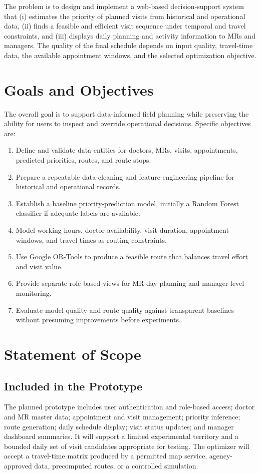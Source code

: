 \documentclass[12pt,a4paper,oneside]{report}
\begin{document}
The problem is to design and implement a web-based decision-support system that (i) estimates the priority of planned visits from historical and operational data, (ii) finds a feasible and efficient visit sequence under temporal and travel constraints, and (iii) displays daily planning and activity information to MRs and managers. The quality of the final schedule depends on input quality, travel-time data, the available appointment windows, and the selected optimization objective.

\section{Goals and Objectives}
The overall goal is to support data-informed field planning while preserving the ability for users to inspect and override operational decisions. Specific objectives are:
\begin{enumerate}[leftmargin=1.2cm]
\item Define and validate data entities for doctors, MRs, visits, appointments, predicted priorities, routes, and route stops.
\item Prepare a repeatable data-cleaning and feature-engineering pipeline for historical and operational records.
\item Establish a baseline priority-prediction model, initially a Random Forest classifier if adequate labels are available.
\item Model working hours, doctor availability, visit duration, appointment windows, and travel times as routing constraints.
\item Use Google OR-Tools to produce a feasible route that balances travel effort and visit value.
\item Provide separate role-based views for MR day planning and manager-level monitoring.
\item Evaluate model quality and route quality against transparent baselines without presuming improvements before experiments.
\end{enumerate}

\section{Statement of Scope}
\subsection{Included in the Prototype}
The planned prototype includes user authentication and role-based access; doctor and MR master data; appointment and visit management; priority inference; route generation; daily schedule display; visit status updates; and manager dashboard summaries. It will support a limited experimental territory and a bounded daily set of visit candidates appropriate for testing. The optimizer will accept a travel-time matrix produced by a permitted map service, agency-approved data, precomputed routes, or a controlled simulation.
\end{document}
